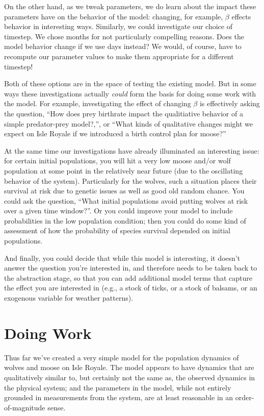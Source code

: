 \documentclass{tufte-handout}
\begin{document}
On the other hand, as we tweak parameters, we do learn about the impact these parameters have on the behavior of the model: changing, for example, $\beta$ effects behavior in interesting ways.  Similarly, 
we could investigate our choice of timestep.  We chose months for not particularly compelling reasons.  Does the model behavior change if we use days instead?  We would, of course, have to recompute our parameter values to make them appropriate for a different timestep!

Both of these options are in the space of testing the existing model.  But in some ways these investigations actually {\it could} form the basis for doing some work with the model.  For example, investigating the effect of changing $\beta$ is effectively asking the question, ``How does prey birthrate impact the qualitiative behavior of a simple predator-prey model?,'', or ``What kinds of qualitative changes might we expect on Isle Royale if we introduced a birth control plan for moose?''

At the same time our investigations have already illuminated an interesting issue:  for certain initial populations, you will hit a very low moose and/or wolf population at some point in the relatively near future (due to the oscillating behavior of the system).  Particularly for the wolves, such a situation places their survival at risk due to genetic issues as well as good old random chance.  You could ask the question, ``What initial populations avoid putting wolves at risk over a given time window?''.  Or you could improve your model to include probabilities in the low population condition; then you could do some kind of assessment of how the probability of species survival depended on initial populations.

And finally, you could decide that while this model is interesting, it doesn't answer the question you're interested in, and therefore needs to be taken back to the abstraction stage, so that you can add additional model terms that capture the effect you are interested in (e.g., a stock of ticks, or a stock of balsams, or an exogenous variable for weather patterns).  

\section{Doing Work}

Thus far we've created a very simple model for the population dynamics of wolves and moose on Isle Royale.  The model appears to have dynamics that are qualitatively similar to, but certainly not the same as, the observed dynamics in the physical system; and the parameters in the model, while not entirely grounded in measurements from the system, are at least reasonable in an order-of-magnitude sense.  
\end{document}
